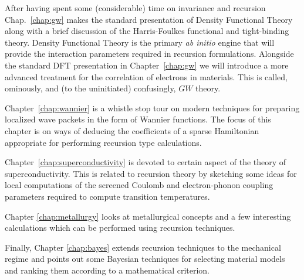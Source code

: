 After having spent some (considerable) time on invariance and recursion
Chap.~\ref{chap:gw} makes the standard presentation of Density Functional Theory along 
with a brief discussion of the Harris-Foulkes functional and tight-binding theory. 
Density Functional Theory is the primary {\it ab initio} engine that will 
provide the interaction parameters required in recursion formulations.
Alongside the standard DFT presentation in Chapter~\ref{chap:gw} we will
introduce a more advanced treatment for the correlation of electrons in materials.
This is called, ominously, and (to the uninitiated) confusingly, $GW$ theory.

Chapter~\ref{chap:wannier} is a whistle stop tour 
on modern techniques for preparing localized wave packets in the 
form of Wannier functions. The focus of this chapter is on 
ways of deducing the coefficients of a sparse Hamiltonian
appropriate for performing recursion type calculations.



Chapter~\ref{chap:superconductivity} is devoted to
certain aspect of the theory of superconductivity. 
This is related to recursion theory by sketching some ideas for 
local computations of the screened Coulomb and electron-phonon
coupling parameters required to compute transition temperatures.

Chapter \ref{chap:metallurgy} looks at metallurgical concepts 
and a few interesting calculations which can be performed 
using recursion techniques. 

Finally, Chapter \ref{chap:bayes} extends recursion techniques
to the mechanical regime and points out some Bayesian techniques 
for selecting material models and ranking them according 
to a mathematical criterion. 

